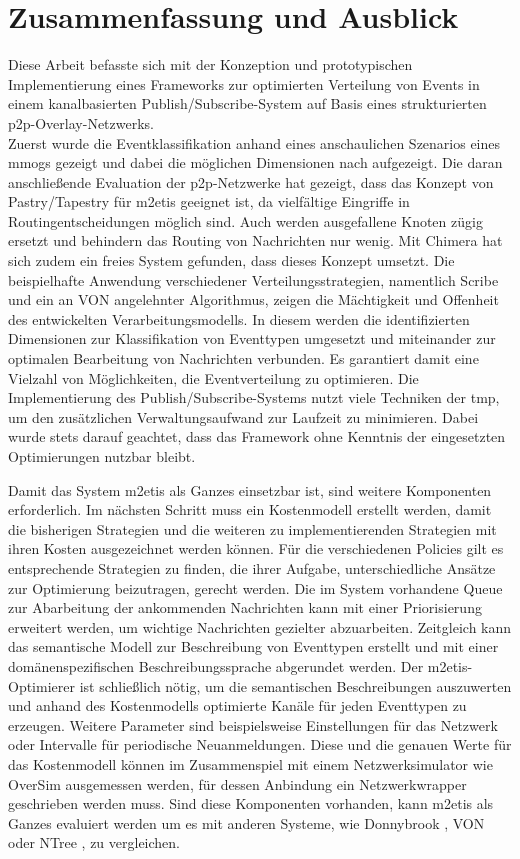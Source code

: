 \chapter{Zusammenfassung und Ausblick} 
\label{chap:zus}
Diese Arbeit befasste sich mit der Konzeption und prototypischen Implementierung eines Frameworks zur optimierten Verteilung von Events in einem kanalbasierten Publish/Subscribe-System auf Basis eines strukturierten p2p-Overlay-Netzwerks.\\
Zuerst wurde die Eventklassifikation anhand eines anschaulichen Szenarios eines \acp{mmog} gezeigt und dabei die möglichen Dimensionen nach \cite{Fischer2010Event} aufgezeigt. Die daran anschließende Evaluation der p2p-Netzwerke hat gezeigt, dass das Konzept von Pastry/Tapestry für \ac{m2etis} geeignet ist, da vielfältige Eingriffe in Routingentscheidungen möglich sind. Auch werden ausgefallene Knoten zügig ersetzt und behindern das Routing von Nachrichten nur wenig. Mit Chimera hat sich zudem ein freies System gefunden, dass dieses Konzept umsetzt. Die beispielhafte Anwendung verschiedener Verteilungsstrategien, namentlich Scribe und ein an VON angelehnter Algorithmus, zeigen die Mächtigkeit und Offenheit des entwickelten Verarbeitungsmodells. In diesem werden die identifizierten Dimensionen zur Klassifikation von Eventtypen umgesetzt und miteinander zur optimalen Bearbeitung von Nachrichten verbunden. Es garantiert damit eine Vielzahl von Möglichkeiten, die Eventverteilung zu optimieren. Die Implementierung des Publish/Subscribe-Systems nutzt viele Techniken der \ac{tmp}, um den zusätzlichen Verwaltungsaufwand zur Laufzeit zu minimieren. Dabei wurde stets darauf geachtet, dass das Framework ohne Kenntnis der eingesetzten Optimierungen nutzbar bleibt.

Damit das System \ac{m2etis} als Ganzes einsetzbar ist, sind weitere Komponenten erforderlich. Im nächsten Schritt muss ein Kostenmodell erstellt werden, damit die bisherigen Strategien und die weiteren zu implementierenden Strategien mit ihren Kosten ausgezeichnet werden können. Für die verschiedenen Policies gilt es entsprechende Strategien zu finden, die ihrer Aufgabe, unterschiedliche Ansätze zur Optimierung beizutragen, gerecht werden. Die im System vorhandene Queue zur Abarbeitung der ankommenden Nachrichten kann mit einer Priorisierung erweitert werden, um wichtige Nachrichten gezielter abzuarbeiten. Zeitgleich kann das semantische Modell zur Beschreibung von Eventtypen erstellt und mit einer domänenspezifischen Beschreibungssprache abgerundet werden. Der \ac{m2etis}-Optimierer ist schließlich nötig, um die semantischen Beschreibungen auszuwerten und anhand des Kostenmodells optimierte Kanäle für jeden Eventtypen zu erzeugen. Weitere Parameter sind beispielsweise Einstellungen für das Netzwerk oder Intervalle für periodische Neuanmeldungen. Diese und die genauen Werte für das Kostenmodell können im Zusammenspiel mit einem Netzwerksimulator wie OverSim \cite{Baumgart2007OverSim} ausgemessen werden, für dessen Anbindung ein Netzwerkwrapper geschrieben werden muss. Sind diese Komponenten vorhanden, kann \ac{m2etis} als Ganzes evaluiert werden um es mit anderen Systeme, wie Donnybrook \cite{Bharambe2008Donnybrook}, VON \cite{Hu2006VON} oder NTree \cite{GauthierDickey2005Using}, zu vergleichen.
